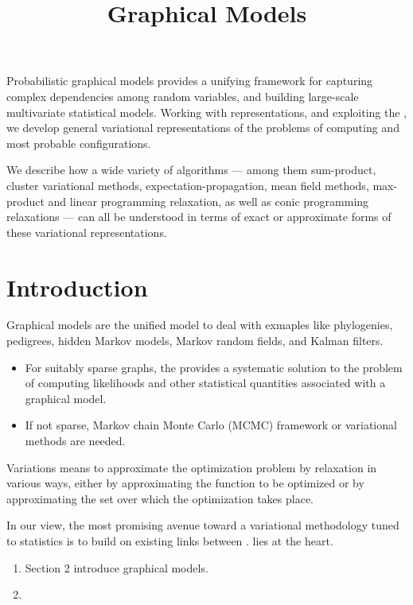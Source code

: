 \documentclass{article}
\title{Graphical Models}
\begin{document}
\maketitle
Probabilistic graphical models provides a unifying framework for capturing complex dependencies among random variables, and building large-scale multivariate statistical models. Working with  representations, and exploiting the , we develop general variational representations of the problems of computing  and most probable conﬁgurations.

We describe how a wide variety of algorithms — among them sum-product, cluster variational methods, expectation-propagation, mean ﬁeld methods, max-product and linear programming relaxation, as well as conic programming relaxations — can all be understood in terms of exact or approximate forms of these variational representations.
\section{Introduction}
Graphical models are the unified  model to deal with exmaples like phylogenies, pedigrees, hidden Markov models, Markov random fields, and Kalman filters. 

\begin{itemize}
    \item For suitably sparse graphs, the  provides a systematic solution to the problem of computing likelihoods and other statistical quantities associated with a graphical model.
    \item If not sparse, Markov chain Monte Carlo (MCMC) framework or variational methods are needed.
\end{itemize}

Variations means to approximate the optimization problem by relaxation in various ways, either by approximating the function to be optimized or by approximating the set over which the optimization takes place. 

In our view, the most promising avenue toward a variational methodology tuned to statistics is to build on existing links between .  lies at the heart.

\begin{enumerate}
    \item Section 2 introduce graphical models.
    \item 
\end{enumerate}
\end{document}
